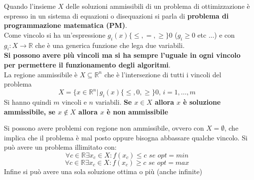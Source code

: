 \documentclass[a4paper,12pt, oneside]{book}
\begin{document}
\begin{definizione}
  Quando l'insieme $X$ delle soluzioni ammissibili di un problema di
  ottimizzazione è espresso in un sistema di equazioni o disequazioni si
  parla di \textbf{problema di programmazione matematica (PM)}.\\
  Come vincolo si ha un'espressione $g_i(x)\{\leq, =, \geq\} 0$
  ($g_i\geq 0$ etc $\ldots$) e con
  $g_i:X\to \mathbb{R}$ che è una generica funzione che lega due
  variabili. \\
  \textbf{Si possono avere più vincoli ma si ha sempre l'uguale in ogni
    vincolo per permettere il funzionamento degli algoritmi}.\\
  La regione ammissibile è $X\subseteq\mathbb{R}^n$ che è l'intersezione
  di tutti i vincoli del problema
  \[X=\{x\in\mathbb{R}^n|\, g_i(x)\{\leq, 0, \geq\}0,\,i=1,\ldots,m\]
  Si hanno quindi $m$ vincoli e $n$ variabili.
  \textbf{Se $x \in X$ allora $x$ è soluzione ammissibile,
    se $x \not\in X$ allora $x$ è non ammissibile}
\end{definizione}
Si possono avere problemi con regione non ammissibile, ovvero con
$X=\emptyset$, che implica che il problema è mal posto oppure bisogna
abbassare qualche vincolo. Si può avere un problema illimitato con:
\[\forall c \in \mathbb{R}\exists x_c\in X:f(x_c)\leq c\,\, se\,\,
  opt = min\]
\[\forall c \in \mathbb{R}\exists x_c\in X:f(x_c)\geq c\,\, se\,\,
  opt = max\]
Infine si può avere una sola soluzione ottima o più (anche infinite)
\end{document}
